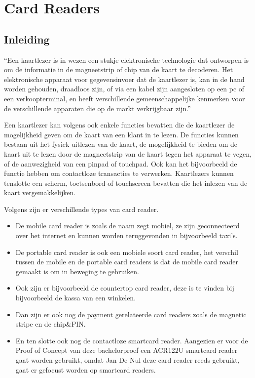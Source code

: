 \section{Card Readers}
\subsection{Inleiding}
``Een kaartlezer is in wezen een stukje elektronische technologie dat ontworpen is om de informatie in de magneetstrip of chip van de kaart te decoderen. Het elektronische apparaat voor gegevensinvoer dat de kaartlezer is, kan in de hand worden gehouden, draadloos zijn, of via een kabel zijn aangesloten op een pc of een verkoopterminal, en heeft verschillende gemeenschappelijke kenmerken voor de verschillende apparaten die op de markt verkrijgbaar zijn.''\autocite{MarinPenchevCardReader}

Een kaartlezer kan volgens \textcite{MarinPenchevCardReader} ook enkele functies bevatten die de kaartlezer de mogelijkheid geven om de kaart van een klant in te lezen. De functies kunnen bestaan uit het fysiek uitlezen van de kaart, de mogelijkheid te bieden om de kaart uit te lezen door de magneetstrip van de kaart tegen het apparaat te vegen, of de aanwezigheid van een pinpad of touchpad. Ook kan het bijvoorbeeld de functie hebben om contactloze transacties te verwerken. Kaartlezers kunnen tenslotte een scherm, toetsenbord of touchscreen bevatten die het inlezen van de kaart vergemakkelijken.

Volgens \textcite{MarinPenchevCardReader} zijn er verschillende types van card reader. 
\begin{itemize}
    \item De mobile card reader is zoals de naam zegt mobiel, ze zijn geconnecteerd over het internet en kunnen worden teruggevonden in bijvoorbeeld taxi's.
    \item De portable card reader is ook een mobiele soort card reader, het verschil tussen de mobile en de portable card readers is dat de mobile card reader gemaakt is om in beweging te gebruiken.
    \item Ook zijn er bijvoorbeeld de countertop card reader, deze is te vinden bij bijvoorbeeld de kassa van een winkelen.
    \item Dan zijn er ook nog de payment gerelateerde card readers zoals de magnetic stripe en de chip\&PIN.
    \item En ten slotte ook nog de contactloze smartcard reader. Aangezien er voor de Proof of Concept van deze bachelorproef een ACR122U smartcard reader gaat worden gebruikt, omdat Jan De Nul deze card reader reeds gebruikt, gaat er gefocust worden op smartcard readers.
\end{itemize}





